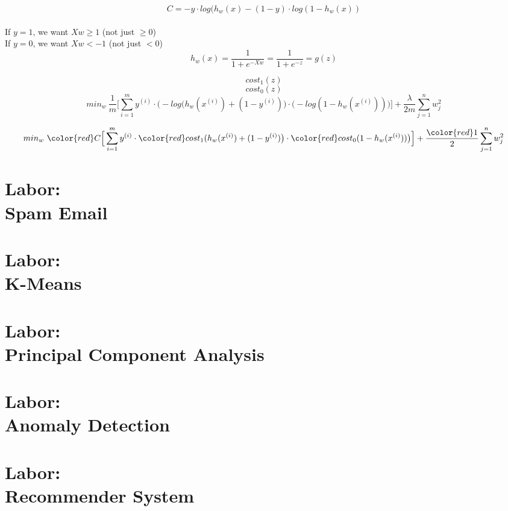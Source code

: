 \documentclass[12pt]{article}
\begin{document}
\begin{equation}
C = -y \cdot log(h_w(x)-(1-y)\cdot log(1-h_w(x))
\end{equation}
 \\
If $y=1$, we want $Xw\geq 1$ (not just $\geq 0$)\\
If $y=0$, we want $Xw< -1$ (not just $< 0$)\\

\begin{equation}
h_w(x)=\frac{1}{1+e^{-Xw}}=\frac{1}{1+e^{-z}}=g(z)
\end{equation}

$$cost_1(z)$$
$$cost_0(z)$$
\begin{equation}
min_w\ \frac{1}{m} \Big[ \sum_{i=1}^m y^{(i)}\cdot \big(-log(h_w(x^{(i)})+(1-y^{(i)})\big)\cdot \big(-log(1-h_w(x^{(i)}))\big)\Big] +\frac{\lambda}{2m}\sum_{j=1}^nw_j^2
\end{equation}

\begin{equation}
min_w\ {\color{red} C} \Big[ \sum_{i=1}^m y^{(i)}\cdot {\color{red} cost_1}(h_w(x^{(i)})+(1-y^{(i)})\big)\cdot{\color{red} cost_0}(1-h_w(x^{(i)}))\big)\Big] +\frac{{\color{red} 1}}{2}\sum_{j=1}^nw_j^2
\end{equation}

\newpage
\section{Labor:\\ \large Spam Email}
\newpage
\section{Labor:\\ \large K-Means}
\newpage
\section{Labor:\\ \large Principal Component Analysis}
\newpage
\section{Labor:\\ \large Anomaly Detection}
\newpage
\section{Labor:\\ \large Recommender System}
\end{document}
